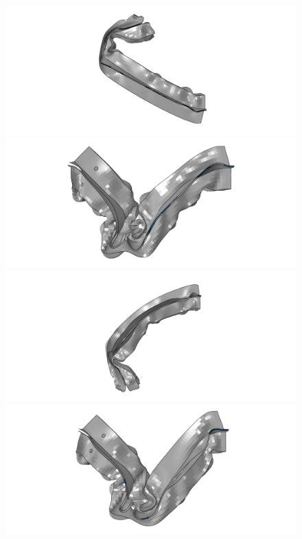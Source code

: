 \documentclass[
documentsize = a4, %
font = cmr, %
typesize = 11, %
printmode = true,
onehalfspacing = true,
language = en, %
titlepage = udciccp, %
degree = pt, %
dedication = true,
acknowledgements = true,
abstract-en = true,
abstract-es = false,
abstract-ga = false,
epigraphs = true,
toc = true,
lof = true,
lot = true,
frontmatterintoc = false,
notation = false,
minimal = false,
]{UDCthesis}
\begin{document}
\begin{figure}
	\centering
	\begin{minipage}[b]{.7\linewidth}
		\includegraphics[width=\linewidth]{IMG_CUTRES/general_bending_73}
	\end{minipage}
	\quad
	\begin{minipage}[b]{.3\linewidth}
		\includegraphics[width=\linewidth]{IMG_CUTRES/general_bending_48}
	\end{minipage}
	\quad
	\begin{minipage}[b]{.3\linewidth}
		\includegraphics[width=\linewidth]{IMG_CUTRES/general_bending_72}
	\end{minipage}
	\quad
	\begin{minipage}[b]{.3\linewidth}
		\includegraphics[width=\linewidth]{IMG_CUTRES/general_bending_55}

\end{minipage}
\end{figure}
\end{document}
